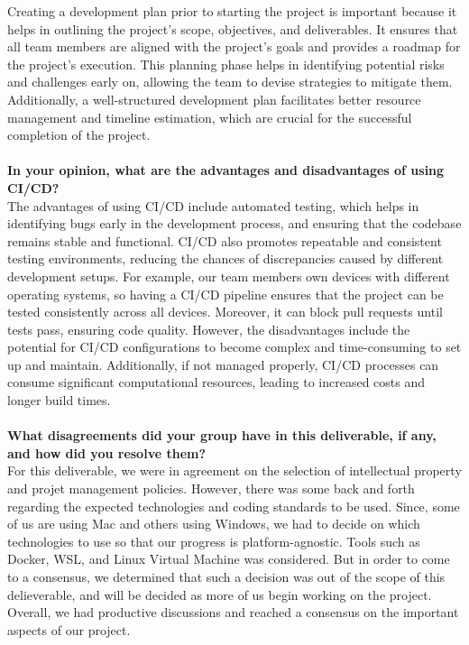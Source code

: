 \documentclass{article}
\begin{document}
\noindent Creating a development plan prior to starting the project is important because it helps in outlining the project's scope, objectives, and deliverables. It ensures that all team members are aligned with the project's goals and provides a roadmap for the project's execution. This planning phase helps in identifying potential risks and challenges early on, allowing the team to devise strategies to mitigate them. Additionally, a well-structured development plan facilitates better resource management and timeline estimation, which are crucial for the successful completion of the project.\\
\\
\textbf{In your opinion, what are the advantages and disadvantages of using CI/CD?}\\

\noindent The advantages of using CI/CD include automated testing, which helps in identifying bugs early in the development process, and ensuring that the codebase remains stable and functional. CI/CD also promotes repeatable and consistent testing environments, reducing the chances of discrepancies caused by different development setups. For example, our team members own devices with different operating systems, so having a CI/CD pipeline ensures that the project can be tested consistently across all devices. Moreover, it can block pull requests until tests pass, ensuring code quality. However, the disadvantages include the potential for CI/CD configurations to become complex and time-consuming to set up and maintain. Additionally, if not managed properly, CI/CD processes can consume significant computational resources, leading to increased costs and longer build times.\\
\\
\textbf{What disagreements did your group have in this deliverable, if any, and how did you resolve them?}\\
    
\noindent For this deliverable, we were in agreement on the selection of intellectual property and projet management policies. However, there was some back and forth regarding the expected technologies and coding standards to be used. Since, some of us are using Mac and others using Windows, we had to decide on which technologies to use so that our progress is platform-agnostic. Tools such as Docker, WSL, and Linux Virtual Machine was considered. But in order to come to a consensus, we determined that such a decision was out of the scope of this delieverable, and will be decided as more of us begin working on the project. Overall, we had productive discussions and reached a consensus on the important aspects of our project.\\
\end{document}
